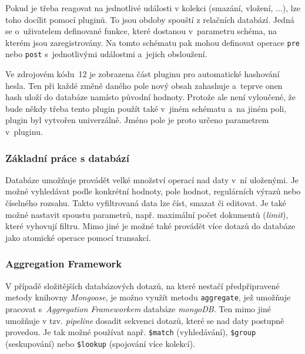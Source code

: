\documentclass[a4paper,12pt]{article}
\def\code#1{\texttt{#1}}
\begin{document}
Pokud je třeba reagovat na jednotlivé události v kolekci (smazání, vložení, ...), lze toho docílit pomocí pluginů. To jsou obdoby spouští z relačních databází. Jedná se o~uživatelem definované funkce, které dostanou v~parametru schéma, na kterém jsou zaregistrovány. Na tomto schématu pak mohou definovat operace \code{pre} nebo \code{post} s~jednotlivými událostmi a~jejich obsloužení.



Ve zdrojovém kódu~12 je zobrazena část pluginu pro automatické hashování hesla. Ten při každé změně daného pole nový obsah zahashuje a~teprve onen hash uloží do databáze namísto původní hodnoty. Protože ale není vyloučené, že bude někdy třeba tento plugin použít také v~jiném schématu a~na jiném poli, plugin byl vytvořen univerzálně. Jméno pole je proto určeno parametrem v~pluginu.

\subsubsection{Základní práce s databází}

Databáze umožňuje provádět velké množství operací nad daty v~ní uloženými. Je možné vyhledávat podle konkrétní hodnoty, pole hodnot, regulárních výrazů nebo číselného rozsahu. Takto vyfiltrovaná data lze číst, smazat či editovat. Je také možné nastavit spoustu parametrů, např. maximální počet dokumentů (\textit{limit}), které vyhovují filtru. Mimo jiné je možné také provádět více dotazů do databáze jako atomické operace pomocí transakcí.



\subsubsection{Aggregation Framework}

V případě složitějších databázových dotazů, na které nestačí předpřipravené metody knihovny \textit{Mongoose}, je možno využít metodu \code{aggregate}, jež umožňuje pracovat s~\textit{Aggregation Frameworkem} databáze \textit{mongoDB}. Ten mimo jiné umožňuje v tzv. \textit{pipeline} dosadit sekvenci dotazů, které se nad daty postupně provedou. Je tak možné používat např. \code{\$match} (vyhledávání), \code {\$group} (seskupování) nebo \code{\$lookup} (spojování více kolekcí).
\end{document}
